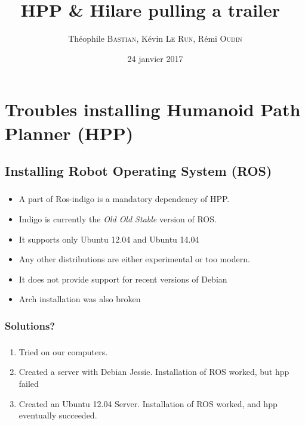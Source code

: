 \documentclass[11pt]{beamer}
\author{Théophile \textsc{Bastian}, Kévin \textsc{Le Run}, Rémi \textsc{Oudin}}
\title{HPP \& \og{}Hilare pulling a trailer~\fg}
\date{24 janvier 2017}
\begin{document}
\begin{frame}
	\titlepage{}
	\tableofcontents
\end{frame}


\section{Troubles installing Humanoid Path Planner (HPP)}

\subsection{Installing Robot Operating System (ROS)}

\begin{frame}
    \frametitle{\subsecname}
    \begin{itemize}
        \item A part of Ros-indigo is a mandatory dependency of HPP.\\
        \item Indigo is currently the \emph{Old Old Stable} version of ROS\@.
        \item It supports only Ubuntu 12.04 and Ubuntu 14.04
        \item Any other distributions are either experimental or too modern.
        \item It does not provide support for recent versions of Debian
        \item Arch installation was also broken
    \end{itemize}
\end{frame}

\subsubsection{Solutions?}

\begin{frame}
    \frametitle{\subsecname}
    \begin{enumerate}
        \item Tried on our computers.
        \item Created a server with Debian Jessie. Installation of ROS worked,
            but hpp failed
        \item Created an Ubuntu 12.04 Server. Installation of ROS worked,
            and hpp eventually succeeded.
    \end{enumerate}
\end{frame}
\end{document}
